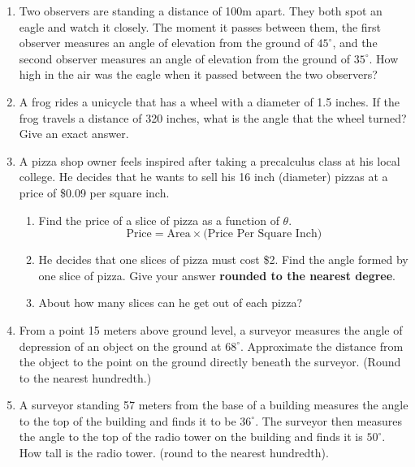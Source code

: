 \documentclass[11pt]{article}
\begin{document}
\begin{enumerate}
\item Two observers are standing a distance of 100m apart.  They both spot an eagle and watch it closely.  The moment it passes between them, the first observer measures an angle of elevation from the ground of $45^\circ$, and the second observer measures an angle of elevation from the ground of $35^\circ.$  How high in the air was the eagle when it passed between the two observers?\vfill


\newpage

\item A frog rides a unicycle that has a wheel with a diameter of 1.5 inches.  If the frog travels a distance of 320 inches, what is the angle that the wheel turned?  Give an exact answer.\vfill





\item A pizza shop owner feels inspired after taking a precalculus class at his local college.  He decides that he wants to sell his 16 inch (diameter) pizzas at a price of \$0.09 per square inch.
\begin{enumerate}
\item Find the price of a slice of pizza as a function of $\theta$.
$$\text{Price}=\text{Area}\times \text{(Price Per Square Inch)}$$\vfill
\item He decides that one slices of pizza must cost \$2.  Find the angle formed by one slice of pizza.  Give your answer \textbf{rounded to the nearest degree}.\vfill
\item About how many slices can he get out of each pizza?\vfill

\end{enumerate}

\newpage


\item From a point 15 meters above ground level, a surveyor measures the angle of depression of an object on the ground at $68^\circ$.  Approximate the distance from the object to the point on the ground directly beneath the surveyor. (Round to the nearest hundredth.) \vfill


\item A surveyor standing 57 meters from the base of a building measures the angle to the top of the building and finds it to be $36^\circ$.  The surveyor then measures the angle to the top of the radio tower on the building and finds it is $50^\circ$.  How tall is the radio tower.  (round to the nearest hundredth).\vfill


\end{enumerate}
\end{document}
